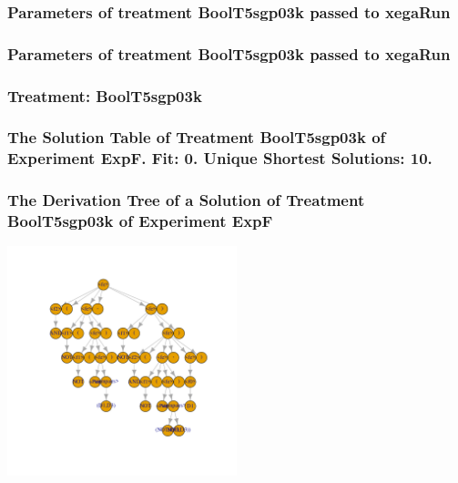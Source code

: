 \documentclass[18pt,c]{beamer}
\begin{document}

 \begin{frame}
 \fontsize{8pt}{9pt}\selectfont
 \frametitle{  Parameters of treatment BoolT5sgp03k passed to xegaRun
 }

 \label{ExpFtParmTable006.tex}  
 \end{frame}


 \begin{frame}
 \fontsize{8pt}{9pt}\selectfont
 \frametitle{  Parameters of treatment BoolT5sgp03k passed to xegaRun
 }

 \label{ExpFtParmTable007.tex}  
 \end{frame}

 \begin{frame}
 \fontsize{8pt}{9pt}\selectfont
 \frametitle{ Treatment: BoolT5sgp03k }

 \label{ExpFStatsTable007.tex}  
 \end{frame}

 \begin{frame}
 \fontsize{8pt}{9pt}\selectfont
 \frametitle{ The Solution Table of Treatment BoolT5sgp03k of Experiment ExpF. Fit: 0. Unique Shortest Solutions: 10. }

 \label{ExpFSolutionTable001.tex}  
 \end{frame}

 \begin{frame}
 \frametitle{ The Derivation Tree of a Solution of Treatment BoolT5sgp03k of Experiment ExpF }
 \begin{center}
\includegraphics[width=0.5\textwidth, angle=0]
{ExpFDerivationTreeFigure001.pdf}
 \end{center}
 \label{report/ExpFDerivationTreeFigure001.pdf}  
 \end{frame}
\end{document}
